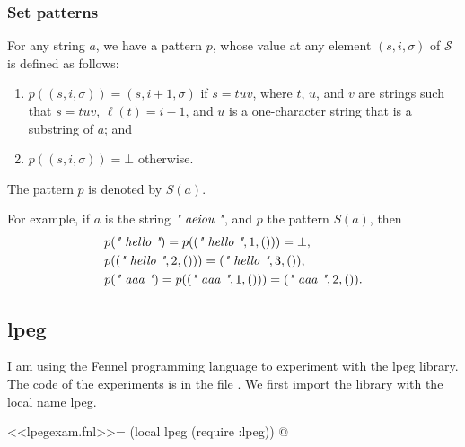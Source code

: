 \documentclass{article}
\begin{document}
\subsubsection{Set patterns}
\label{sec:zxaanwjq}

For any string \(a\), we have a pattern \(p\), whose value at any
element \((s, i, \sigma)\) of \(\mathscr{S}\) is defined as follows:
\begin{enumerate}
\item \(p((s, i, \sigma)) = (s, i + 1, \sigma)\) if \(s = tuv\), where
  \(t\), \(u\), and \(v\) are strings such that \(s = tuv\),
  \(\ell(t) = i - 1\), and \(u\) is a one-character string that is a
  substring of \(a\); and
\item \(p((s, i, \sigma)) = \bot\) otherwise.
\end{enumerate}
The pattern \(p\) is denoted by \(S(a)\).

For example, if \(a\) is the string \(\text{\itshape" aeiou "}\), and \(p\) the
pattern \(S(a)\), then
\begin{align*}
  &p(\text{\itshape" hello "}) = p((\text{\itshape" hello "}, 1, ())) = \bot, \\
  &p((\text{\itshape" hello "}, 2, ())) = (\text{\itshape" hello "}, 3, ()), \\
  &p(\text{\itshape" aaa "}) = p((\text{\itshape" aaa "}, 1, ())) = (\text{\itshape" aaa "}, 2, ()).
\end{align*}

\subsection{lpeg}
\label{sec:2pj8tomh}

I am using the Fennel programming language \parencite{bib:3jfp5s36} to
experiment with the \textsf{lpeg} library.  The code of the
experiments is in the file .  We first import
the library with the local name \textsf{lpeg}.
\begin{codechunk}
<<lpegexam.fnl>>=
(local lpeg (require :lpeg))
@ %
\end{codechunk}
\end{document}
